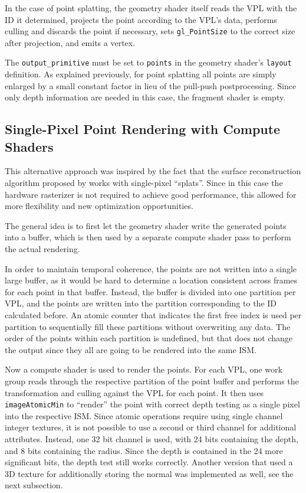 In the case of point splatting, the geometry shader itself reads the VPL with the ID it determined, projects the point according to the VPL's data, performs culling and discards the point if necessary, sets \texttt{gl\_PointSize} to the correct size after projection, and emits a vertex.

The \texttt{output\_primitive} must be set to \texttt{points} in the geometry shader's \texttt{layout} definition. As explained previously, for point splatting all points are simply enlarged by a small constant factor in lieu of the pull-push postprocessing. Since only depth information are needed in this case, the fragment shader is empty.



\subsection{Single-Pixel Point Rendering with Compute Shaders}
\label{sec:impl:singlePixelRendering}

This alternative approach was inspired by the fact that the surface reconstruction algorithm proposed by \citet{Marroquim:2007:reconstruction} works with single-pixel ``splats''. Since in this case the hardware rasterizer is not required to achieve good performance, this allowed for more flexibility and new optimization opportunities.

The general idea is to first let the geometry shader write the generated points into a buffer, which is then used by a separate compute shader pass to perform the actual rendering.

In order to maintain temporal coherence, the points are not written into a single large buffer, as it would be hard to determine a location consistent across frames for each point in that buffer. Instead, the buffer is divided into one partition per VPL, and the points are written into the partition corresponding to the ID calculated before. An atomic counter that indicates the first free index is used per partition to sequentially fill these partitions without overwriting any data. The order of the points within each partition is undefined, but that does not change the output since they all are going to be rendered into the same ISM.

Now a compute shader is used to render the points. For each VPL, one work group reads through the respective partition of the point buffer and performs the transformation and culling against the VPL for each point. It then uses \texttt{imageAtomicMin} to ``render'' the point with correct depth testing as a single pixel into the respective ISM. Since atomic operations require using single channel integer textures, it is not possible to use a second or third channel for additional attributes. Instead, one 32 bit channel is used, with 24 bits containing the depth, and 8 bits containing the radius. Since the depth is contained in the 24 more significant bits, the depth test still works correctly. Another version that used a 3D texture for additionally storing the normal was implemented as well, see the next subsection.

